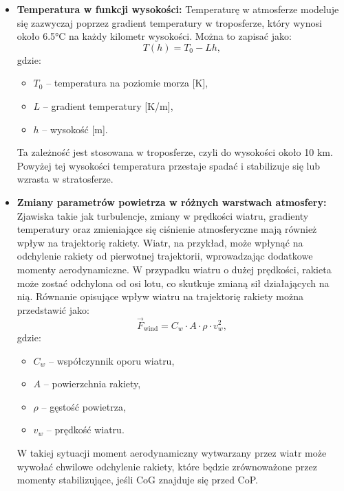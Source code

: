 \begin{itemize}
    \item \textbf{Temperatura w funkcji wysokości:}
    Temperaturę w atmosferze modeluje się zazwyczaj poprzez gradient temperatury w troposferze, który wynosi około 6.5°C na każdy kilometr wysokości. Można to zapisać jako:
    \begin{equation}
    T(h) = T_0 - L h,
    \label{eq:temperature}
    \end{equation}
    gdzie:
    \begin{itemize}
        \item $T_0$ -- temperatura na poziomie morza [K],
        \item $L$ -- gradient temperatury [K/m],
        \item $h$ -- wysokość [m].
    \end{itemize}
    Ta zależność jest stosowana w troposferze, czyli do wysokości około 10 km. Powyżej tej wysokości temperatura przestaje spadać i stabilizuje się lub wzrasta w stratosferze.

    \item \textbf{Zmiany parametrów powietrza w różnych warstwach atmosfery:}
    Zjawiska takie jak turbulencje, zmiany w prędkości wiatru, gradienty temperatury oraz zmieniające się ciśnienie atmosferyczne mają również wpływ na trajektorię rakiety. Wiatr, na przykład, może wpłynąć na odchylenie rakiety od pierwotnej trajektorii, wprowadzając dodatkowe momenty aerodynamiczne. W przypadku wiatru o dużej prędkości, rakieta może zostać odchylona od osi lotu, co skutkuje zmianą sił działających na nią. Równanie opisujące wpływ wiatru na trajektorię rakiety można przedstawić jako:
    \begin{equation}
    \vec{F}_\text{wind} = C_w \cdot A \cdot \rho \cdot v_w^2,
    \end{equation}
    gdzie:
    \begin{itemize}
        \item $C_w$ -- współczynnik oporu wiatru,
        \item $A$ -- powierzchnia rakiety,
        \item $\rho$ -- gęstość powietrza,
        \item $v_w$ -- prędkość wiatru.
    \end{itemize}
    W takiej sytuacji moment aerodynamiczny wytwarzany przez wiatr może wywołać chwilowe odchylenie rakiety, które będzie zrównoważone przez momenty stabilizujące, jeśli CoG znajduje się przed CoP.

\end{itemize}
